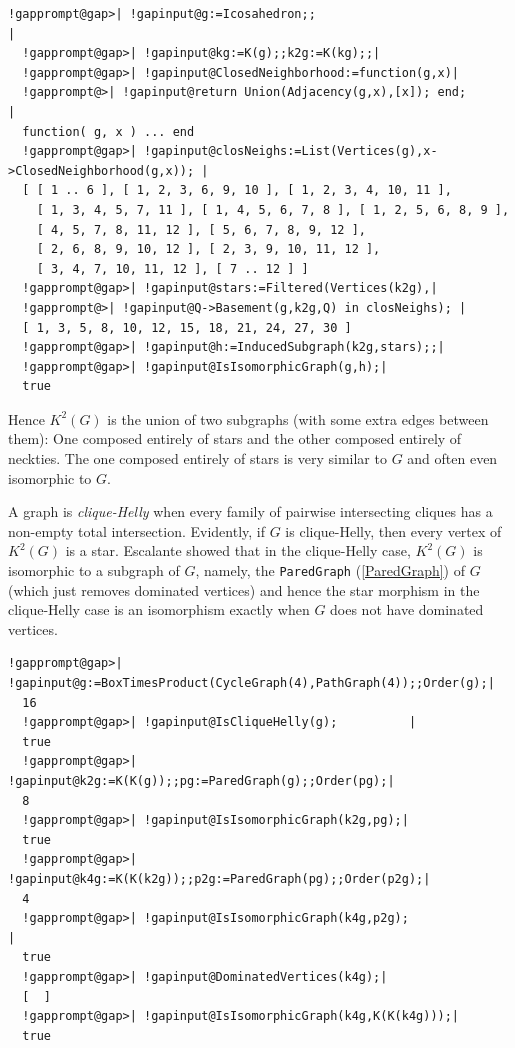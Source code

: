 \documentclass[a4paper,11pt]{report}
\begin{document}
{{ 
\begin{Verbatim}[commandchars=!@|,fontsize=\small,frame=single,label=Example]
  !gapprompt@gap>| !gapinput@g:=Icosahedron;;                                 |
  !gapprompt@gap>| !gapinput@kg:=K(g);;k2g:=K(kg);;|
  !gapprompt@gap>| !gapinput@ClosedNeighborhood:=function(g,x)|
  !gapprompt@>| !gapinput@return Union(Adjacency(g,x),[x]); end;       |
  function( g, x ) ... end
  !gapprompt@gap>| !gapinput@closNeighs:=List(Vertices(g),x->ClosedNeighborhood(g,x)); |
  [ [ 1 .. 6 ], [ 1, 2, 3, 6, 9, 10 ], [ 1, 2, 3, 4, 10, 11 ], 
    [ 1, 3, 4, 5, 7, 11 ], [ 1, 4, 5, 6, 7, 8 ], [ 1, 2, 5, 6, 8, 9 ], 
    [ 4, 5, 7, 8, 11, 12 ], [ 5, 6, 7, 8, 9, 12 ], 
    [ 2, 6, 8, 9, 10, 12 ], [ 2, 3, 9, 10, 11, 12 ], 
    [ 3, 4, 7, 10, 11, 12 ], [ 7 .. 12 ] ]
  !gapprompt@gap>| !gapinput@stars:=Filtered(Vertices(k2g),|
  !gapprompt@>| !gapinput@Q->Basement(g,k2g,Q) in closNeighs); |
  [ 1, 3, 5, 8, 10, 12, 15, 18, 21, 24, 27, 30 ]
  !gapprompt@gap>| !gapinput@h:=InducedSubgraph(k2g,stars);;|
  !gapprompt@gap>| !gapinput@IsIsomorphicGraph(g,h);|
  true
\end{Verbatim}
 

Hence $K^2(G)$ is the union of two subgraphs (with some extra edges between them): One
composed entirely of stars and the other composed entirely of neckties. The
one composed entirely of stars is very similar to $G$ and often even isomorphic to $G$. 

A graph is \emph{clique-Helly} when every family of pairwise intersecting cliques has a non-empty total
intersection. Evidently, if $G$ is clique-Helly, then every vertex of $K^2(G)$ is a star. Escalante \cite{Esc73} showed that in the clique-Helly case, $K^2(G)$ is isomorphic to a subgraph of $G$, namely, the \texttt{ParedGraph} (\ref{ParedGraph}) of $G$ (which just removes dominated vertices) and hence the star morphism in the clique-Helly case is an isomorphism
exactly when $G$ does not have dominated vertices. 

 
\begin{Verbatim}[commandchars=!@|,fontsize=\small,frame=single,label=Example]
  !gapprompt@gap>| !gapinput@g:=BoxTimesProduct(CycleGraph(4),PathGraph(4));;Order(g);|
  16
  !gapprompt@gap>| !gapinput@IsCliqueHelly(g);          |
  true
  !gapprompt@gap>| !gapinput@k2g:=K(K(g));;pg:=ParedGraph(g);;Order(pg);|
  8
  !gapprompt@gap>| !gapinput@IsIsomorphicGraph(k2g,pg);|
  true
  !gapprompt@gap>| !gapinput@k4g:=K(K(k2g));;p2g:=ParedGraph(pg);;Order(p2g);|
  4
  !gapprompt@gap>| !gapinput@IsIsomorphicGraph(k4g,p2g);                     |
  true
  !gapprompt@gap>| !gapinput@DominatedVertices(k4g);|
  [  ]
  !gapprompt@gap>| !gapinput@IsIsomorphicGraph(k4g,K(K(k4g)));|
  true
\end{Verbatim}
 }

}
\end{document}
